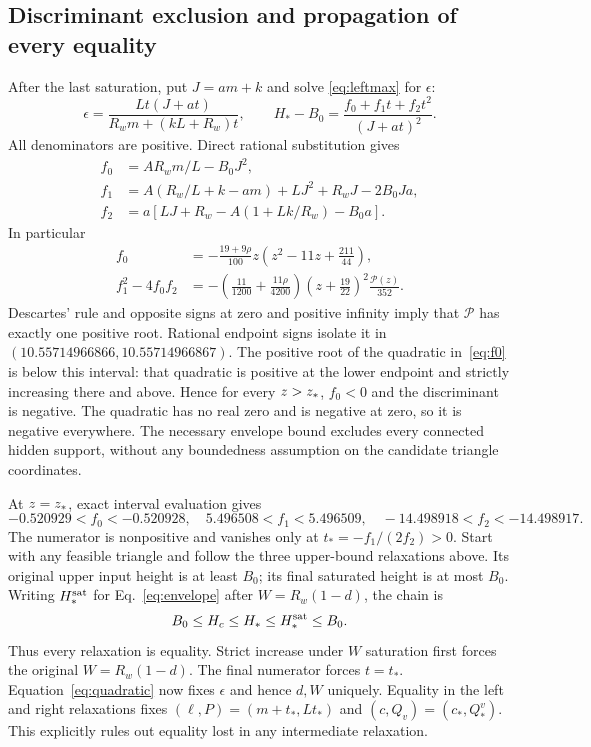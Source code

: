 \subsection{Discriminant exclusion and propagation of every equality}
After the last saturation, put $J=am+k$ and solve
\eqref{eq:leftmax} for $\epsilon$:
\begin{equation}
 \epsilon=\frac{Lt(J+at)}{R_wm+(kL+R_w)t},\qquad
 H_*-B_0=\frac{f_0+f_1t+f_2t^2}{(J+at)^2}.\label{eq:quadratic}
\end{equation}
All denominators are positive. Direct rational substitution gives
\begin{align}
 f_0&=AR_wm/L-B_0J^2,\\
 f_1&=A(R_w/L+k-am)+LJ^2+R_wJ-2B_0Ja,\\
 f_2&=a[LJ+R_w-A(1+Lk/R_w)-B_0a].\label{eq:fcoeff}
\end{align}
In particular
\begin{align}
 f_0&=-\frac{19+9\rho}{100}z\left(z^2-11z+\frac{211}{44}\right),\label{eq:f0}\\
 f_1^2-4f_0f_2
 &=-\left(\frac{11}{1200}+\frac{11\rho}{4200}\right)
 \left(z+\frac{19}{22}\right)^2\frac{\mathcal P(z)}{352}.
 \label{eq:discriminant}
\end{align}
Descartes' rule and opposite signs at zero and positive infinity imply
that $\mathcal P$ has exactly one positive root. Rational endpoint signs
isolate it in $(10.55714966866,10.55714966867)$. The positive root of the
quadratic in~\eqref{eq:f0} is below this interval: that quadratic is
positive at the lower endpoint and strictly increasing there and
above. Hence for every $z>z_*$, $f_0<0$ and the discriminant is negative.
The quadratic has no real zero and is negative at zero, so it is
negative everywhere. The necessary envelope bound excludes every
connected hidden support, without any boundedness assumption on the
candidate triangle coordinates.

At $z=z_*$, exact interval evaluation gives
\begin{equation}
 -0.520929<f_0<-0.520928,\quad
 5.496508<f_1<5.496509,\quad
 -14.498918<f_2<-14.498917.
\end{equation}
The numerator is nonpositive and vanishes only at
$t_*=-f_1/(2f_2)>0$. Start with any feasible triangle and follow the
three upper-bound relaxations above. Its original upper input height is
at least $B_0$; its final saturated height is at most $B_0$. Writing
$H_*^{\rm sat}$ for Eq.~\eqref{eq:envelope} after $W=R_w(1-d)$, the chain is
\begin{equation}
 B_0\le H_c\le H_*\le H_*^{\rm sat}\le B_0.
 \label{eq:equality-chain}
\end{equation}
Thus every relaxation is equality. Strict increase under $W$ saturation
first forces the original $W=R_w(1-d)$. The final numerator forces
$t=t_*$. Equation~\eqref{eq:quadratic} now fixes $\epsilon$ and hence
$d,W$ uniquely. Equality in the left and right relaxations fixes
$(\ell,P)=(m+t_*,Lt_*)$ and $(c,Q_v)=(c_*,Q_*^v)$.
This explicitly rules out equality lost in any intermediate relaxation.

